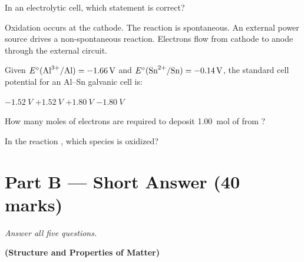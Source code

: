 \documentclass[addpoints]{exam}
\begin{document}
\begin{questions}
\question[1] In an electrolytic cell, which statement is correct?
\begin{choices}
    \choice Oxidation occurs at the cathode.
    \choice The reaction is spontaneous.
    \correctchoice An external power source drives a non-spontaneous reaction.
    \choice Electrons flow from cathode to anode through the external circuit.
\end{choices}

\question[1] Given $E^\circ(\ce{Al^{3+}/Al}) = -\SI{1.66}{V}$ and
$E^\circ(\ce{Sn^{2+}/Sn}) = -\SI{0.14}{V}$, the standard cell potential for an
Al--Sn galvanic cell is:
\begin{choices}
    \choice $-\SI{1.52}{V}$
    \correctchoice $+\SI{1.52}{V}$
    \choice $+\SI{1.80}{V}$
    \choice $-\SI{1.80}{V}$
\end{choices}

\question[1] How many moles of electrons are required to deposit \SI{1.00}{mol} of
 from ?
\begin{choices}
\end{choices}

\question[1] In the reaction ,
which species is oxidized?
\begin{choices}
    \choice {}
    \choice {}
    \correctchoice {}
    \choice {}
\end{choices}


\section*{Part B --- Short Answer (40 marks)}
\vspace{3mm}
\noindent\textit{Answer all five questions.}
\vspace{3mm}

\question \textbf{(Structure and Properties of Matter)}
\end{questions}
\end{document}
